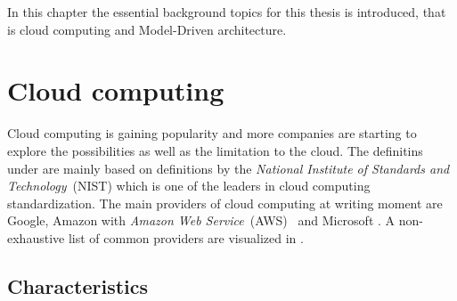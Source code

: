 


In this chapter the essential background topics for this thesis is introduced,
that is cloud computing and Model-Driven architecture.

\section{Cloud computing}

Cloud computing is gaining popularity and more companies are starting 
to explore the possibilities as well as the limitation to the cloud.
The definitins under are mainly based on definitions by 
the \emph{National Institute of Standards and Technology}~(NIST) which is one of 
the leaders in cloud computing standardization.
The main providers of cloud computing at writing moment 
are Google, Amazon with \emph{Amazon Web Service}~(AWS)~\cite{aws} and Microsoft .
A non-exhaustive list of common providers are visualized in .

\subsection{Characteristics}

